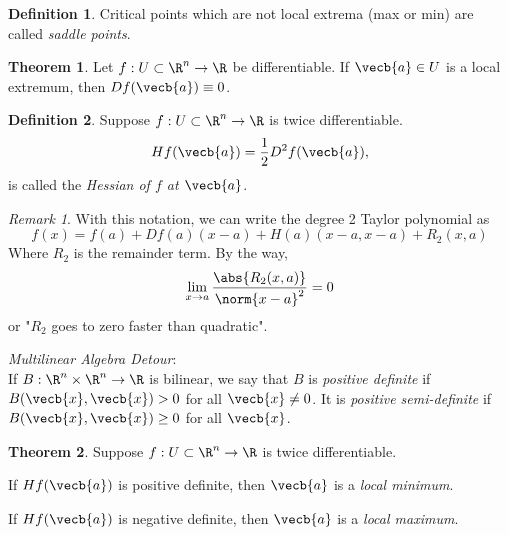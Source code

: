 \documentclass[a5paper]{article}
\theoremstyle{definition}%
\newtheorem{theorem}{Theorem}
\newtheorem*{definition*}{Definition}
\numberwithin{exercise}{section}
\theoremstyle{remark}%
\newtheorem*{remark*}{Remark}
\begin{document}
\begin{definition*}
Critical points which are not local extrema (max or min) are called \emph{saddle points}. 
\end{definition*}

\begin{highlight}
\begin{theorem}
Let $f:U\subset \R^n\to \R$ be differentiable. If $\vecb{a}\in U$ is a local extremum, then $Df(\vecb{a})\equiv 0$. 
\end{theorem}
\end{highlight}

\begin{highlight}
\begin{definition*}
Suppose $f:U\subset \R^n\to \R$ is twice differentiable. 
$$Hf(\vecb{a})=\frac{1}{2}D^2f(\vecb{a}),$$
is called the \emph{Hessian of $f$ at $\vecb{a}$}.
\end{definition*}
\end{highlight}

\begin{remark*}
With this notation, we can write the degree 2 Taylor polynomial as 
$$f(x)=f(a)+Df(a)(x-a)+H(a)(x-a, x-a)+R_2(x,a)$$
Where $R_2$ is the remainder term. By the way, 
$$\lim_{x\to a}\frac{\abs{R_2(x,a)}}{\norm{x-a}^2}=0$$
or "$R_2$ goes to zero faster than quadratic". 
\end{remark*}

\noindent \textit{Multilinear Algebra Detour}:\\
If $B:\R^n\times \R^n \to \R$ is bilinear, we say that $B$ is \emph{positive definite} if $B(\vecb{x}, \vecb{x})>0$ for all $\vecb{x}\neq0$. It is \emph{positive semi-definite} if $B(\vecb{x}, \vecb{x})\geq0$ for all $\vecb{x}$. 

\begin{highlight}
\begin{theorem}
Suppose $f:U\subset \R^n\to \R$ is twice differentiable. 

\mbox{}
If $Hf(\vecb{a})$ is positive definite, then $\vecb{a}$ is a \emph{local minimum}. 

\mbox{}
If $Hf(\vecb{a})$ is negative definite, then $\vecb{a}$ is a \emph{local maximum}. 
\end{theorem}
\end{highlight}
\end{document}

